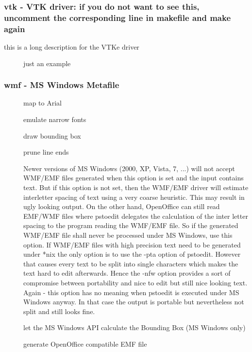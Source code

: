 \documentclass[english,a4paper]{article}
\begin{document}
\subsubsection{vtk - VTK driver: if you do not want to see this, uncomment the corresponding line in makefile and make again}
this is a long description for the VTKe driver

\begin{description}
\item[]
just an example


\end{description}
\subsubsection{wmf - MS Windows Metafile}
\begin{description}
\item[]
map to Arial


\item[]
emulate narrow fonts


\item[]
draw bounding box


\item[]
prune line ends


\item[]
Newer versions of MS Windows (2000, XP, Vista, 7, ...) will not accept WMF/EMF files generated when this option is set and the input contains text. But if this option is not set, then the WMF/EMF driver will estimate interletter spacing of text using a very coarse heuristic. This may result in ugly looking output. On the other hand, OpenOffice can still read EMF/WMF files where pstoedit delegates the calculation of the inter letter spacing to the program reading the WMF/EMF file. So if the generated WMF/EMF file shall never be processed under MS Windows, use this option. If WMF/EMF files with high precision text need to be generated under *nix the only option is to use the -pta option of pstoedit. However that causes every text to be split into single characters which makes the text hard to edit afterwards. Hence the -nfw option provides a sort of compromise between portability and nice to edit but still nice looking text. Again - this option has no meaning when pstoedit is executed under MS Windows anyway. In that case the output is portable but nevertheless not split and still looks fine.


\item[]
let the MS Windows API calculate the Bounding Box (MS Windows only)


\item[]
generate OpenOffice compatible EMF file


\end{description}
\end{document}
